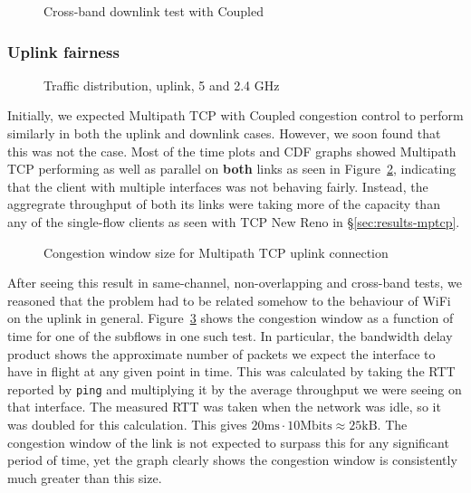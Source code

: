\begin{figure}[h]
 \centering
 
 \caption{Cross-band downlink test with Coupled}\label{graph:cb-fairness-down}
\end{figure}

\subsubsection{Uplink fairness}

\begin{figure}[h]
 \centering
 
 \caption{Traffic distribution, uplink, 5 and 2.4 GHz}\label{graph:up-fair}
\end{figure}

Initially, we expected Multipath TCP with Coupled congestion control to perform
similarly in both the uplink and downlink cases. However, we soon found
that this was not the case. Most of the time plots and CDF graphs showed 
Multipath TCP performing as well as parallel on \textbf{both} links as seen in
Figure~\ref{graph:up-fair}, indicating that the client with multiple interfaces was
not behaving fairly. Instead, the aggregrate throughput of both its links were taking more of the capacity than any of the single-flow clients as seen with TCP New Reno in \S\ref{sec:results-mptcp}.

\begin{figure}[h]
 \centering
 
 \caption{Congestion window size for Multipath TCP uplink connection}\label{graph:fairness-up-close}
\end{figure}

After seeing this result in same-channel, non-overlapping and cross-band  
tests, we reasoned that the problem had to be related somehow to the 
behaviour of WiFi on the uplink in general. Figure~\ref{graph:fairness-up-close} 
shows the congestion window as a function of time for one of the subflows in one 
such test. In particular, the bandwidth delay product shows the approximate number of packets
we expect the interface to have in flight at any given point in time. This was
calculated by taking the RTT reported by \texttt{ping} and multiplying it by the
average throughput we were seeing on that interface. The measured RTT was taken
when the network was idle, so it was doubled for this calculation. This gives
$20\text{ms} \cdot 10\text{Mbits} \approx 25\text{kB}$. The congestion window of
the link is not expected to surpass this for any significant period of time, yet
the graph clearly shows the congestion window is consistently much greater than
this size.


